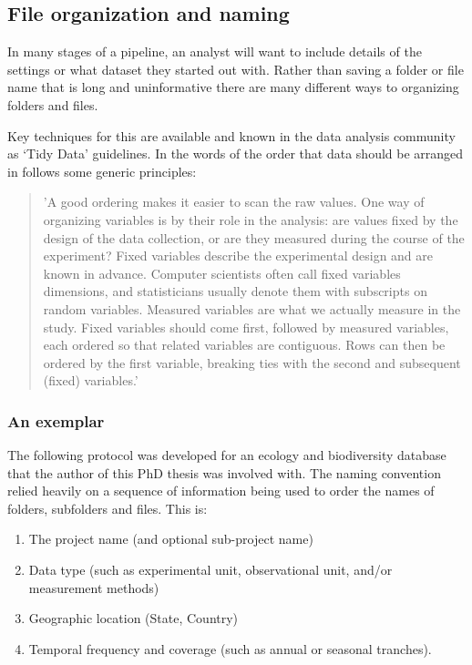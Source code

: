 \documentclass[11pt,a4paper]{article}
\begin{document}
\subsection{File organization and
naming}\label{file-organization-and-naming}

In many stages of a pipeline, an analyst will want to include details of
the settings or what dataset they started out with. Rather than saving a
folder or file name that is long and uninformative there are many
different ways to organizing folders and files.

Key techniques for this are available and known in the data analysis
community as `Tidy Data' guidelines. In the words of \citet{WickhamRstudio2014} the
order that data should be arranged in follows some generic principles:

\begin{quote}
'A good ordering makes it easier to scan the raw values. One way of
organizing variables is by their role in the analysis: are values
fixed by the design of the data collection, or are they measured
during the course of the experiment? Fixed variables describe the
experimental design and are known in advance. Computer scientists
often call fixed variables dimensions, and statisticians usually
denote them with subscripts on random variables. Measured variables
are what we actually measure in the study. Fixed variables should come
first, followed by measured variables, each ordered so that related
variables are contiguous. Rows can then be ordered by the first
variable, breaking ties with the second and subsequent (fixed)
variables.'
\end{quote}

\subsubsection{An exemplar}\label{an-exemplar}

The following protocol was developed for an ecology and biodiversity
database that the author of this PhD thesis was involved with. The
naming convention relied heavily on a sequence of information being used
to order the names of folders, subfolders and files. This is:

\begin{enumerate}
\def\labelenumi{\arabic{enumi}.}
\itemsep1pt\parskip0pt
\item
  The project name (and optional sub-project name)
\item
  Data type (such as experimental unit, observational unit, and/or
  measurement methods)
\item
  Geographic location (State, Country)
\item
  Temporal frequency and coverage (such as annual or seasonal tranches).
\end{enumerate}
\end{document}
